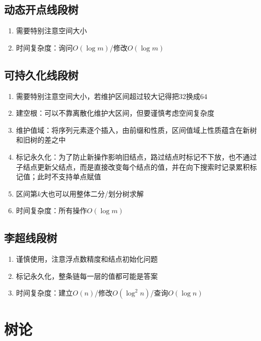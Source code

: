 \documentclass[twocolumn,a4,8pt]{article}  %
\begin{document}
	 	\subsection{动态开点线段树}
			\noindent\begin{enumerate}
				\item 需要特别注意空间大小
				\item 时间复杂度：询问$O(\log m)$/修改$O(\log m)$
			\end{enumerate}
	 	 	
	 	 	
		\subsection{可持久化线段树}
			\noindent\begin{enumerate}
				\item 需要特别注意空间大小，若维护区间超过较大记得把$32$换成$64$
				\item 建空根：可以不靠离散化维护大区间，但要谨慎考虑空间复杂度
				\item 维护值域：将序列元素逐个插入，由前缀和性质，区间值域上性质蕴含在新树和旧树的差之中
				\item 标记永久化：为了防止新操作影响旧结点，路过结点时标记不下放，也不通过子结点更新父结点，而是直接改变每个结点的值，并在向下搜索时记录累积标记值；此时不支持单点赋值
				\item 区间第$k$大也可以用整体二分/划分树求解
				\item 时间复杂度：所有操作$O(\log m)$
			
			\end{enumerate}
	 	 	
	 	 	
		\subsection{李超线段树}
			\noindent\begin{enumerate}
				\item 谨慎使用，注意浮点数精度和结点初始化问题
				\item 标记永久化，整条链每一层的值都可能是答案
				\item 时间复杂度：建立$O(n)$/修改$O(\log^2n)$/查询$O(\log n)$
			\end{enumerate}
			
	 	 	
	\section{树论}
\end{document}
